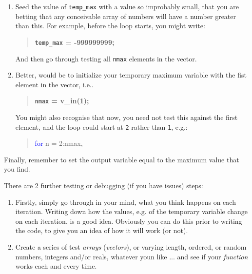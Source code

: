 \documentclass{tufte-book} %
\newenvironment{docspec}{\begin{quotation}\ttfamily\parskip0pt\parindent0pt\ignorespaces}{\end{quotation}}
\newenvironment{docspecbold}{\begin{quotation}\ttfamily\bfseries\parskip0pt\parindent0pt\ignorespaces}{\end{quotation}}
\begin{document}
\begin{enumerate}[noitemsep]
\setlength{\itemindent}{.2in}
\vspace{1mm}
\item Seed the value of \texttt{temp\_max} with a value so improbably small, that you are betting that any conceivable array of numbers will have a number greater than this. For example, \uline{before} the loop starts, you might write:
\begin{docspecbold}
\texttt{temp\_max} = -999999999;
\end{docspecbold} And then go through testing all \texttt{nmax} elements in the vector.
\vspace{1mm}
\item Better, would be to initialize your temporary maximum variable with the fist element in the vector, i.e..
\begin{docspecbold}
\texttt{nmax} = v\_in(1);
\end{docspecbold}
You might also recognise that now, you need not test this against the first element, and the loop could  start at \texttt{2} rather than \texttt{1}, e.g.:
\begin{docspec}
\textcolor{blue}{for} n = 2:nmax,
\end{docspec} 
\end{enumerate}

Finally, remember to set the output variable equal to the maximum value that you find.

There are 2 further testing or debugging (if you have issues) steps:

\begin{enumerate}[noitemsep]
\setlength{\itemindent}{.2in}
\vspace{1mm}
\item Firstly, simply go through in your mind, what you think happens on each iteration. Writing down how the values, e.g. of the temporary variable change on each iteration, is a good idea. Obviously you can do this prior to writing the code, to give you an idea of how it will work (or not).
\vspace{1mm}
\item Create a series of test \textit{arrays} (\textit{vectors}), or varying length, ordered, or random numbers, integers and/or reals, whatever youn like ...  and see if your \textit{function} works each and every time.
\end{enumerate}
\end{document}
